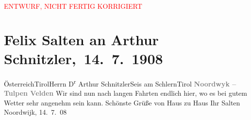 
\begin{center}
            \textcolor{red}{ENTWURF, NICHT FERTIG KORRIGIERT}
                      \end{center}
            
         \renewcommand{\erwaehnteOrte}{Orte: Noordwijk, Seis am Schlern, Tirol, Österreich}
         \renewcommand{\erwaehnteWerke}{}
               \section[ Felix Salten an Arthur Schnitzler, 14. 7. 1908]{ Felix Salten an Arthur Schnitzler, 14. 7. 1908}\nopagebreak{}\rehead{ }\begin{ledgroupsized}[t]{13cm}\normalsize\beginnumbering \toendnotes[C]{\smallbreak\pagebreak[2]} 
\toendnotes[C]{\smallbreak}\pstart{}{\pb}Österreich\pend{}\pstart{}Tirol\pend{}\pstart{}Herrn D\textsuperscript{r} Arthur Schnitzler\pend{}\pstart{}Seis am Schlern\pend{}\pstart{}Tirol\pend{}{\bigskip}\pstart
           \noindent{}\centering{}{\pb}\textcolor{gray}{\textbf{Noordwyk – Tulpen Velden}}\pend
           \pstart
           Wir sind nun nach langen Fahrten endlich hier, wo es bei gutem Wetter sehr angenehm sein kann. Schönste
               Grüße von Haus zu Haus\pend
           \pstart Ihr \spacefill\mbox{Salten}\pend{}\pstart
           Noordwijk, 14. 7. 08\pend
           
         
         \endnumbering{}\end{ledgroupsized}  \newcommand{\dateiname}{L03498}\newcommand{\titel}{Felix Salten an Arthur Schnitzler, 14. 7. 1908}\newcommand{\editorInnen}{Martin Anton Müller und Laura Untner}
      
